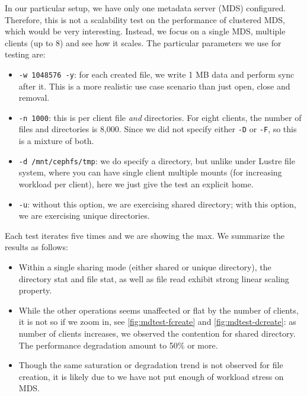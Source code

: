 \documentclass{article}
\begin{document}
In our particular setup, we have only one metadata server (MDS)
configured. Therefore, this is not a scalability test on the performance of
clustered MDS, which would be very interesting.
Instead, we focus on a single MDS, multiple clients (up to 8) and see how it
scales. The particular parameters we use for testing are:

\begin{itemize}
\item \verb!-w 1048576 -y!: for each created file, we write 1 MB data and
perform sync after it. This is a more realistic use case scenario than just
open, close and removal.

\item \verb!-n 1000!: this is per client file \textit{and} directories. For eight
clients, the number of files and directories is 8,000. Since we did not specify
either \verb!-D! or \verb!-F!, so this is a mixture of both.

\item \verb!-d /mnt/cephfs/tmp!: we do specify a directory, but unlike under
Lustre file system, where you can have single client multiple mounts (for
increasing workload per client), here we just give the test an explicit home.

\item \verb!-u!: without this option, we are exercising shared directory; with
this option, we are exercising unique directories.

\end{itemize}

Each test iterates five times and we are showing the max. 
We summarize the results as follows:


\begin{itemize}

\item Within a single sharing mode (either shared or unique directory), the
directory stat and file stat, as well as file read exhibit strong linear
scaling property. 

\item While the other operations seems unaffected or flat by the number of
clients, it is not so if we zoom in, see \ref{fig:mdtest-fcreate} and
\ref{fig:mdtest-dcreate}:  as number of clients increases, we observed the
contention for shared directory. The performance degradation amount to 50\% or
more.

\item Though the same saturation or degradation trend is not observed for file
creation, it is likely due to we have not put enough of workload stress on MDS.

\end{itemize}
\end{document}
